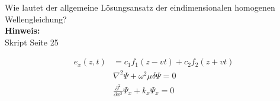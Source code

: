 \begin{question}[section=3,name={Eindimenstionale homogene Wellengleichung},difficulty=,quantity=3,type=thr,tags={20130625}]
	Wie lautet der allgemeine Lösungsansatz der eindimensionalen homogenen Wellengleichung?
	\\ \textbf{Hinweis:}\\
	Skript Seite 25
\end{question}
\begin{solution}
	\begin{align}
	e_x(z,t) &= c_1 f_1(z-v t) + c_2 f_2 (z+v t)\\
	 &\nabla^2\Psi+\omega^2\mu\delta\Psi=0  \\
	  &\frac{\partial^2}{\partial x^2}\Psi_x+k_x\Psi_x=0
	\end{align}
\end{solution}